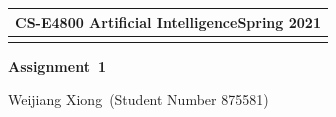 \documentclass[a4paper,11pt]{article} %
\newcommand{\lineSpace}{1.1}
\newcommand{\exeNum}{1}
\newcommand{\assType}{Assignment}
\newcommand{\courseName}{CS-E4800 Artificial Intelligence}
\newcommand{\semester}{Spring 2021}
\newcommand{\studentName}{Weijiang Xiong}
\newcommand{\studentNumber}{875581}
\begin{document}
\linespread{\lineSpace} %




\thispagestyle{empty} %

\begin{tabular}{p{15.5cm}} %
{\large \bf \courseName \hfill \semester} \\
\hline %
\\
\end{tabular} %


\begin{center} %
	{\Large \bf \assType\ \exeNum} %

	{\studentName\ (Student Number \studentNumber)} %
		
\end{center}  
% 


\end{document}
